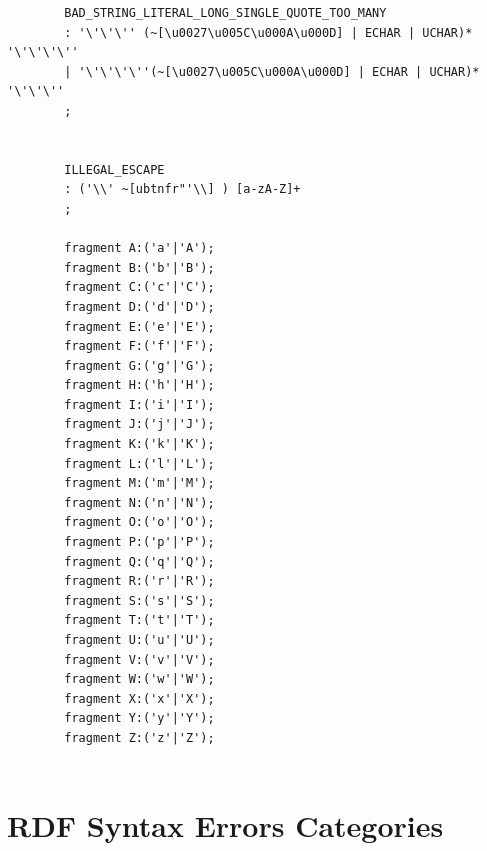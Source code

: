 \begin{appendices}
\begin{lstlisting}
		BAD_STRING_LITERAL_LONG_SINGLE_QUOTE_TOO_MANY
		: '\'\'\'' (~[\u0027\u005C\u000A\u000D] | ECHAR | UCHAR)*  '\'\'\'\''
		| '\'\'\'\''(~[\u0027\u005C\u000A\u000D] | ECHAR | UCHAR)*  '\'\'\''
		;
		
		
		ILLEGAL_ESCAPE
		: ('\\' ~[ubtnfr"'\\] ) [a-zA-Z]+ 
		;
		
		fragment A:('a'|'A');
		fragment B:('b'|'B');
		fragment C:('c'|'C');
		fragment D:('d'|'D');
		fragment E:('e'|'E');
		fragment F:('f'|'F');
		fragment G:('g'|'G');
		fragment H:('h'|'H');
		fragment I:('i'|'I');
		fragment J:('j'|'J');
		fragment K:('k'|'K');
		fragment L:('l'|'L');
		fragment M:('m'|'M');
		fragment N:('n'|'N');
		fragment O:('o'|'O');
		fragment P:('p'|'P');
		fragment Q:('q'|'Q');
		fragment R:('r'|'R');
		fragment S:('s'|'S');
		fragment T:('t'|'T');
		fragment U:('u'|'U');
		fragment V:('v'|'V');
		fragment W:('w'|'W');
		fragment X:('x'|'X');
		fragment Y:('y'|'Y');
		fragment Z:('z'|'Z');	


\end{lstlisting}

\chapter{RDF Syntax Errors Categories }
\label{ch:synErrCategories}




\end{appendices}
